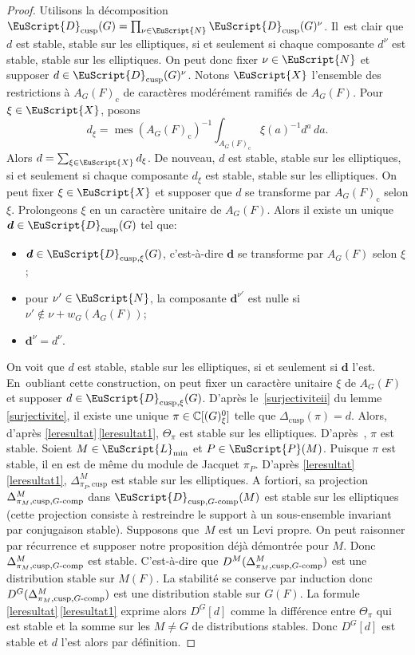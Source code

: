 \documentclass[JEP,XML,SOM,Unicode,francais]{cedram}
\let\mathcal \EuScript
\newcommand{\NoChangel}[1]{%
\expandafter\let\csname old\string#1\endcsname=#1
\let#1=\relax
\newcommand{#1}{\mathcode`l="716C\csname old\string#1\endcsname\mathcode`l="7160 }%
}
\newcommand{\rc}{\mathrm{c}}
\newcommand{\tcomp}{\textup{-comp}}
\newcommand{\cusp}{\mathrm{cusp}}
\newcommand{\Ell}{\mathrm{Ell}} \NoChangel{\Ell}
\DeclareMathOperator{\mes}{mes}
\newcommand{\bmd}{\boldsymbol{d}}
\newcommand{\cD}{\mathcal{D}}
\newcommand{\cL}{\mathcal{L}}
\newcommand{\cN}{\mathcal{N}}
\newcommand{\cP}{\mathcal{P}}
\newcommand{\cX}{\mathcal{X}}
\newcommand{\CC}{\mathbb{C}}
\theoremstyle{plain}
\theoremstyle{definition}
\begin{document}
\begin{proof}
Utilisons la décomposition $\cD_{\cusp}(G)=\prod_{\nu\in \cN}\cD_{\cusp}(G)^{\nu}$. Il~est clair que $d$ est stable, \resp stable sur les elliptiques, si et seulement si chaque composante $d^{\nu}$ est stable, \resp stable sur les elliptiques. On peut donc fixer $\nu\in \cN$ et supposer $d\in \cD_{\cusp}(G)^{\nu}$. Notons $\cX$ l'ensemble des restrictions à $A_{G}(F)_{\rc}$ de caractères modérément ramifiés de $A_{G}(F)$. Pour $\xi\in \cX$, posons
\[
d_{\xi}=\mes(A_{G}(F)_{\rc})^{-1}\int_{A_{G}(F)_{\rc}}\xi(a)^{-1}{d^{a}}\, da.
\]
Alors $d=\sum_{\xi\in \cX}d_{\xi}$. De nouveau, $d$ est stable, \resp stable sur les elliptiques, si et seulement si chaque composante $d_{\xi}$ est stable, \resp stable sur les elliptiques. On peut fixer $\xi\in \cX$ et supposer que $d$ se transforme par $A_{G}(F)_{\rc}$ selon $\xi$. Prolongeons $\xi$ en un caractère unitaire de $A_{G}(F)$. Alors il existe un unique $\bmd\in \cD_{\cusp}(G)$ tel que:
\begin{itemize}
\item
$\bmd\in \cD_{\cusp,\xi}(G)$, c'est-à-dire $\bmd$ se transforme par $A_{G}(F)$ selon $\xi$;

\item
pour $\nu'\in \cN$, la composante $\bmd^{\nu'}$ est nulle si $\nu'\not\in \nu+w_{G}(A_{G}(F))$;

\item
$\bmd^{\nu}=d^{\nu}$.
\end{itemize}

On voit que $d$ est stable, \resp stable sur les elliptiques, si et seulement si $\bmd$ l'est. En~oubliant cette construction, on peut fixer un caractère unitaire $\xi$ de $A_{G}(F)$ et supposer $d\in \cD_{\cusp,\xi}(G)$. D'après le~\eqref{surjectiviteii} du lemme \ref{surjectivite}, il existe une unique $\pi\in \CC[\Ell(G)_{\xi}^0]$ telle que $\Delta_{\cusp}(\pi)=d$. Alors, d'après \ref{leresultat}\,\eqref{leresultat1}, $\Theta_{\pi}$ est stable sur les \hbox{elliptiques}. D'après~\cite[Th.\,6.1]{A3}, $\pi$ est stable. Soient $M\in \cL_{\min}$ et $P\in \cP(M)$. Puisque $\pi$ est stable, il en est de même du module de Jacquet $\pi_{P}$. D'après
\ref{leresultat}\,\eqref{leresultat1}, $\Delta^M_{\pi_{P},\cusp}$ est stable sur les elliptiques. A fortiori, sa projection $\Delta^M_{\pi_{M},\cusp,G\tcomp}$ dans $\cD_{\cusp,G\tcomp}(M)$ est stable sur les elliptiques (cette projection consiste à restreindre le support à un sous-ensemble invariant par conjugaison stable). Supposons que~$M$ est un Levi propre. On peut raisonner par récurrence et supposer notre proposition déjà démontrée pour $M$. Donc $\Delta^M_{\pi_{M},\cusp,G\tcomp}$ est stable. C'est-à-dire que $D^M(\Delta^M_{\pi_{M},\cusp,G\tcomp})$ est une distribution stable sur $M(F)$. La stabilité se conserve par induction donc $D^G(\Delta^M_{\pi_{M},\cusp,G\tcomp})$ est une distribution stable sur $G(F)$. La formule \ref{leresultat}\,\eqref{leresultat1} exprime alors $D^G[d]$ comme la différence entre $\Theta_{\pi}$ qui est stable et la somme sur les $M\neq G$ de distributions stables. Donc $D^G[d]$ est stable et $d$ l'est alors par définition.
\end{proof}
\end{document}
